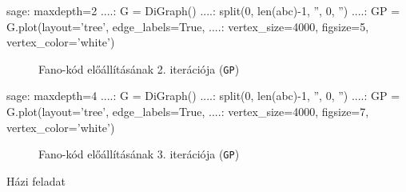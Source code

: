 \begin{sageexample}
  sage: maxdepth=2
  ....: G = DiGraph()
  ....: split(0, len(abc)-1, '', 0, '')
  ....: GP = G.plot(layout='tree', edge_labels=True,
  ....:             vertex_size=4000, figsize=5, vertex_color='white')
\end{sageexample}

\begin{figure}[ht]
  \centering
  \caption{Fano-kód előállításának 2. iterációja (\texttt{GP})}
\end{figure}

\begin{sageexample}
  sage: maxdepth=4
  ....: G = DiGraph()
  ....: split(0, len(abc)-1, '', 0, '')
  ....: GP = G.plot(layout='tree', edge_labels=True,
  ....:             vertex_size=4000, figsize=7, vertex_color='white')
\end{sageexample}

\begin{figure}[ht]
  \centering
  \caption{Fano-kód előállításának 3. iterációja (\texttt{GP})}
\end{figure}

\begin{table}[ht]
  \centering
\end{table}


Házi feladat

